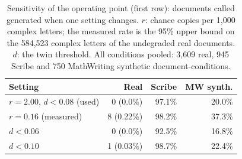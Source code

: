 \begin{table}[t]\centering\caption{Sensitivity of the operating point (first row): documents called generated when one setting changes. $r$: chance copies per 1{,}000 complex letters; the measured rate is the 95\% upper bound on the 584{,}523 complex letters of the undegraded real documents. $d$: the twin threshold. All conditions pooled: 3{,}609 real, 945 Scribe and 750 MathWriting synthetic document-conditions.}\label{tab:sensitivity}
\footnotesize\begin{tabular}{@{}lrrr@{}}\toprule
Setting & Real & Scribe & MW synth. \\\midrule
$r = 2.00$, $d < 0.08$ (used) & 0 (0.0\%) & 97.1\% & 20.0\% \\
$r = 0.16$ (measured) & 8 (0.22\%) & 98.2\% & 37.3\% \\
$d < 0.06$ & 0 (0.0\%) & 92.5\% & 16.8\% \\
$d < 0.10$ & 1 (0.03\%) & 98.7\% & 22.4\% \\
\bottomrule\end{tabular}\end{table}
